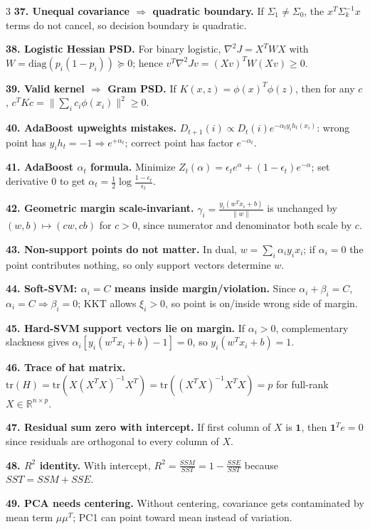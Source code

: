 \documentclass[8pt,fleqn]{extarticle}
\begin{document}
\begin{multicols}{3}
\textbf{37. Unequal covariance $\Rightarrow$ quadratic boundary.} If $\Sigma_1\neq\Sigma_0$, the $x^T\Sigma_k^{-1}x$ terms do not cancel, so decision boundary is quadratic.

\textbf{38. Logistic Hessian PSD.} For binary logistic, $\nabla^2J=X^TWX$ with $W=\mathrm{diag}(p_i(1-p_i))\succeq0$; hence $v^T\nabla^2Jv=(Xv)^TW(Xv)\ge0$.

\textbf{39. Valid kernel $\Rightarrow$ Gram PSD.} If $K(x,z)=\phi(x)^T\phi(z)$, then for any $c$, $c^TKc=\|\sum_i c_i\phi(x_i)\|^2\ge0$.

\textbf{40. AdaBoost upweights mistakes.} $D_{t+1}(i)\propto D_t(i)e^{-\alpha_ty_ih_t(x_i)}$: wrong point has $y_ih_t=-1\Rightarrow e^{+\alpha_t}$; correct point has factor $e^{-\alpha_t}$.

\textbf{41. AdaBoost $\alpha_t$ formula.} Minimize $Z_t(\alpha)=\epsilon_te^\alpha+(1-\epsilon_t)e^{-\alpha}$; set derivative $0$ to get $\alpha_t=\frac12\log\frac{1-\epsilon_t}{\epsilon_t}$.

\textbf{42. Geometric margin scale-invariant.} $\gamma_i=\frac{y_i(w^Tx_i+b)}{\|w\|}$ is unchanged by $(w,b)\mapsto(cw,cb)$ for $c>0$, since numerator and denominator both scale by $c$.

\textbf{43. Non-support points do not matter.} In dual, $w=\sum_i\alpha_i y_i x_i$; if $\alpha_i=0$ the point contributes nothing, so only support vectors determine $w$.

\textbf{44. Soft-SVM: $\alpha_i=C$ means inside margin/violation.} Since $\alpha_i+\beta_i=C$, $\alpha_i=C\Rightarrow\beta_i=0$; KKT allows $\xi_i>0$, so point is on/inside wrong side of margin.

\textbf{45. Hard-SVM support vectors lie on margin.} If $\alpha_i>0$, complementary slackness gives $\alpha_i[y_i(w^Tx_i+b)-1]=0$, so $y_i(w^Tx_i+b)=1$.

\textbf{46. Trace of hat matrix.} $\mathrm{tr}(H)=\mathrm{tr}(X(X^TX)^{-1}X^T)=\mathrm{tr}((X^TX)^{-1}X^TX)=p$ for full-rank $X\in\mathbb R^{n\times p}$.

\textbf{47. Residual sum zero with intercept.} If first column of $X$ is $\mathbf 1$, then $\mathbf1^Te=0$ since residuals are orthogonal to every column of $X$.

\textbf{48. $R^2$ identity.} With intercept, $R^2=\frac{SSM}{SST}=1-\frac{SSE}{SST}$ because $SST=SSM+SSE$.

\textbf{49. PCA needs centering.} Without centering, covariance gets contaminated by mean term $\mu\mu^T$; PC1 can point toward mean instead of variation.


\end{multicols}
\end{document}
